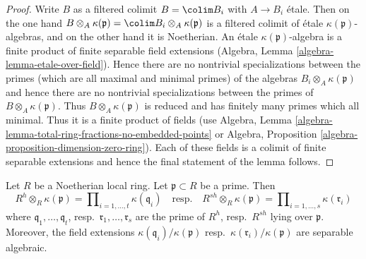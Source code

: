 \begin{proof}
Write $B$ as a filtered colimit $B = \colim B_i$ with $A \to B_i$ \'etale.
Then on the one hand
$B \otimes_A \kappa(\mathfrak p) = \colim B_i \otimes_A \kappa(\mathfrak p)$
is a filtered colimit of \'etale $\kappa(\mathfrak p)$-algebras, and
on the other hand it is Noetherian. An \'etale
$\kappa(\mathfrak p)$-algebra is a finite product of finite separable field
extensions (Algebra, Lemma \ref{algebra-lemma-etale-over-field}).
Hence there are no nontrivial specializations between the primes
(which are all maximal and minimal primes) of the algebras
$B_i \otimes_A \kappa(\mathfrak p)$ and hence there are no
nontrivial specializations between the primes of
$B \otimes_A \kappa(\mathfrak p)$. Thus
$B \otimes_A \kappa(\mathfrak p)$ is reduced and
has finitely many primes which all minimal.
Thus it is a finite product of fields (use
Algebra, Lemma \ref{algebra-lemma-total-ring-fractions-no-embedded-points}
or
Algebra, Proposition \ref{algebra-proposition-dimension-zero-ring}).
Each of these fields is a colimit of finite separable extensions
and hence the final statement of the lemma follows.
\end{proof}

\begin{lemma}
\label{lemma-fibres-henselization}
Let $R$ be a Noetherian local ring. Let $\mathfrak p \subset R$ be a prime.
Then
$$
R^h \otimes_R \kappa(\mathfrak p) =
\prod\nolimits_{i = 1, \ldots, t} \kappa(\mathfrak q_i)
\quad\text{resp.}\quad
R^{sh} \otimes_R \kappa(\mathfrak p) =
\prod\nolimits_{i = 1, \ldots, s} \kappa(\mathfrak r_i)
$$
where $\mathfrak q_1, \ldots, \mathfrak q_t$,
resp.\ $\mathfrak r_1, \ldots, \mathfrak r_s$
are the prime of $R^h$, resp.\ $R^{sh}$ lying over $\mathfrak p$.
Moreover, the field extensions
$\kappa(\mathfrak q_i)/\kappa(\mathfrak p)$
resp.\ $\kappa(\mathfrak r_i)/\kappa(\mathfrak p)$
are separable algebraic.
\end{lemma}


